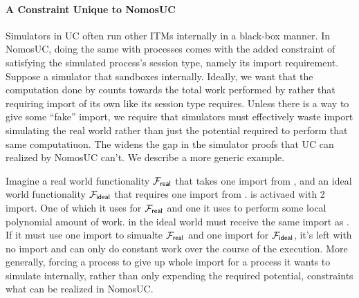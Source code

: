 \paragraph*{\textbf{A Constraint Unique to NomosUC}}
Simulators in UC often run other ITMs internally in a black-box manner. 
In NomosUC, doing the same with processes comes with the added constraint of satisfying the simulated process's session type, namely its import requirement.
Suppose a simulator \Sim that sandboxes \Fro internally. 
Ideally, we want that the computation done by \Fro counts towards the total work performed by \Sim rather that requiring import of its own like its session type requires.
Unless there is a way to give \Fro some ``fake'' import, we require that simulators must effectively waste import simulating the real world rather than just the potential required to perform that same computatiuon.
The widens the gap in the simulator proofs that UC can realized by NomosUC can't.
We describe a more generic example.

Imagine a real world functionality $\mathcal{F}_{\mathsf{real}}$ that takes one import from \A, and an ideal world functionality $\mathcal{F}_{\mathsf{ideal}}$ that requires one import from \Sim.
\A is activaed with 2 import. One of which it uses for $\mathcal{F}_{\mathsf{real}}$ and one it uses to perform some local polynomial amount of work.
\Sim in the ideal world must receive the same import as \A. If it must use one import to simualte $\mathcal{F}_{\mathsf{real}}$ and one import for $\mathcal{F}_{\mathsf{ideal}}$, it's left with no import and can only do constant work over the course of the execution.
More generally, forcing a process to give up whole import for a process it wants to simulate internally, rather than only expending the required potential, constraints what can be realized in NomosUC.


